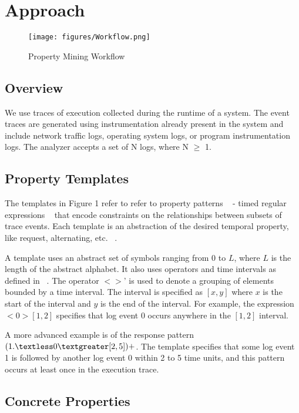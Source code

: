 \documentclass[]{sigplanconf}
\begin{document}
\section{Approach}

\begin{figure}[h]
  \centering
  \texttt{[image: figures/Workflow.png]}
  \caption{Property Mining Workflow}
  \label{fig:work-flow Overview}
\end{figure}

\subsection{Overview}

We use traces of execution collected during the runtime of a system. The event traces are generated using instrumentation already present in the system and include network traffic logs, operating system logs, or program instrumentation logs. The analyzer accepts a set of N logs, where N $\ge$ 1.

\subsection{Property Templates}

The templates in Figure 1 refer to refer to property patterns ~\cite{dwyer} - timed regular expressions ~\cite{timedregex} that encode constraints on the relationships between subsets of trace events. Each template is an abstraction of the desired temporal property, like request, alternating, etc. ~\cite{evans1}.

A template uses an abstract set of symbols ranging from 0 to $L$, where $L$ is the length of the abstract alphabet. It also uses operators and time intervals as defined in ~\cite{timedregex}. The operator $<>$' is used to denote a grouping of elements bounded by a time interval. The interval is specified as $[x, y]$ where $x$ is the start of the interval and $y$ is the end of the interval. For example, the expression $<0>[1,2]$ specifies that log event 0 occurs anywhere in the $[1,2]$ interval.

A more advanced example is of the response pattern  $(1.\textless0\textgreater[2,5])+$. The template specifies that some log event 1 is followed by another log event 0 within 2 to 5 time units, and this pattern occurs at least once in the execution trace.

\subsection{Concrete Properties}
\end{document}

